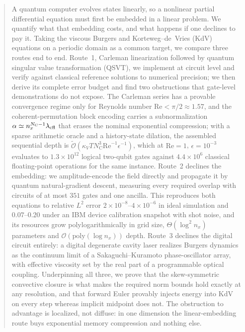 \documentclass[aps,prx,twocolumn,notitlepage,superscriptaddress,floatfix,10pt]{revtex4-2}
\newcommand{\Rey}{\mathrm{Re}}
\newcommand{\Oh}{\mathcal{O}}
\newcommand{\Ot}{\widetilde{\mathcal{O}}}
\newcommand{\NC}{N_{\mathrm{C}}}
\begin{document}
\begin{abstract}
A quantum computer evolves states linearly, so a nonlinear partial differential equation must first be
embedded in a linear problem. We quantify what that embedding costs, and what happens if one declines
to pay it. Taking the viscous Burgers and Korteweg--de~Vries (KdV) equations on a periodic domain as a
common target, we compare three routes end to end. Route~1, Carleman linearization followed by
quantum singular value transformation (QSVT), we implement at circuit level and verify against
classical reference solutions to numerical precision; we then derive its complete error budget and
find two obstructions that gate-level demonstrations do not expose. The Carleman series has a provable
convergence regime only for Reynolds number $\Rey<\pi/2\approx1.57$, and the coherent-permutation block
encoding carries a subnormalization $\alpha\simeq n_x^{\NC-1}\lambda_{\rm cfl}$ that erases the
nominal exponential compression; with a sparse arithmetic oracle and a history-state dilation, the
assembled sequential depth is $\Ot(\kappa_V T\NC^{3}\Rey^{-1}\epsilon^{-1})$, which at $\Rey=1$,
$\epsilon=10^{-3}$ evaluates to $1.3\times10^{12}$ logical two-qubit gates against $4.4\times10^{6}$
classical floating-point operations for the same instance. Route~2 declines the embedding: we
amplitude-encode the field directly and propagate it by quantum natural-gradient descent, measuring
every required overlap with circuits of at most $351$ gates and one ancilla. This reproduces both
equations to relative $L^2$ error $2\times10^{-8}$--$4\times10^{-6}$ in ideal simulation and $0.07$--$0.20$
under an IBM device calibration snapshot with shot noise, and its resources grow polylogarithmically
in grid size, $\Theta(\log^2 n_x)$ parameters and $\Oh(\mathrm{poly}(\log n_x))$ depth. Route~3
declines the digital circuit entirely: a digital degenerate cavity laser realizes Burgers dynamics as
the continuum limit of a Sakaguchi--Kuramoto phase-oscillator array, with effective viscosity set by
the real part of a programmable optical coupling. Underpinning all three, we prove that the
skew-symmetric convective closure is what makes the required norm bounds hold exactly at any
resolution, and that forward Euler provably injects energy into KdV on every step whereas implicit
midpoint does not. The obstruction to advantage is localized, not diffuse: in one dimension the
linear-embedding route buys exponential memory compression and nothing else.
\end{abstract}
\end{document}
